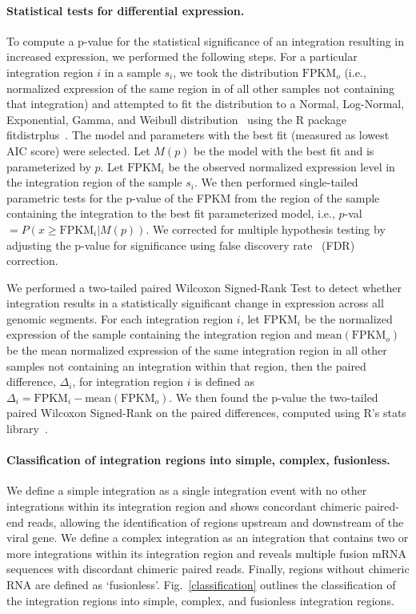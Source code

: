 \documentclass[a4,center,fleqn]{NAR}
\begin{document}
\paragraph{\textbf{Statistical tests for differential expression.}}
To compute a p-value for the statistical significance of an integration resulting in increased expression, we performed the following steps.  For a particular integration region $i$ in a sample $s_i$, we took the distribution $\mbox{FPKM}_{o}$ (i.e., normalized expression of the same region in of all other samples not containing that integration) and attempted to fit the distribution to a Normal, Log-Normal, Exponential, Gamma, and Weibull distribution~\cite{Weibull1951} using the R package fitdistrplus~\cite{Delignette-muller2015}.  The model and parameters with the best fit (measured as lowest AIC score) were selected.  Let $M(p)$ be the model with the best fit and is parameterized by $p$.  Let $\mbox{FPKM}_i$ be the observed normalized expression level in the integration region of the sample $s_i$.  We then performed single-tailed parametric tests for the p-value of the FPKM from the region of the sample containing the integration to the best fit parameterized model, i.e., $p$-val$ =P(x\ge\mbox{FPKM}_i|M(p))$.  We corrected for multiple hypothesis testing by adjusting the p-value for significance using false discovery rate~\cite{Benjamini1995} (FDR) correction.  

We performed a two-tailed paired Wilcoxon Signed-Rank Test to detect whether integration results in a statistically significant change in expression across all genomic segments.  For each integration region $i$, let $\mbox{FPKM}_i$ be the normalized expression of the sample containing the integration region and $\mbox{mean}(\mbox{FPKM}_o)$ be the mean normalized expression of the same integration region in all other samples not containing an integration within that region, then the paired difference, $\Delta_i$, for integration region $i$ is defined as $\Delta_i =\mbox{FPKM}_i-\mbox{mean}(\mbox{FPKM}_o)$.  We then found the p-value the two-tailed paired Wilcoxon Signed-Rank on the paired differences, computed using R's stats library~\cite{R2015}.

\paragraph{Classification of integration regions into simple, complex, fusionless.}
We define a simple integration as a single integration event with no other
integrations within its integration region and shows concordant
chimeric paired-end reads, allowing the identification of regions
upstream and downstream of the viral gene.  We define a complex
integration as an integration that contains two or more integrations
within its integration region and reveals multiple fusion mRNA
sequences with discordant chimeric paired reads. Finally, regions
without chimeric RNA are defined as `fusionless'.  Fig.~\ref{classification} outlines the 
classification of the integration regions into simple, complex, and 
fusionless integration regions.
\end{document}
